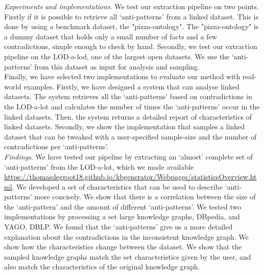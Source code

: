 \documentclass[11pt,letterpaper ,oneside ]{book}
\begin{document}
	\textit{Experiments and implementations}. We test our extraction pipeline on two points. Firstly if it is possible to retrieve all `anti-patterns' from a linked dataset. This is done by using a benchmark dataset, the "pizza-ontology". The "pizza-ontology" is a dummy dataset that holds only a small number of facts and a few contradictions, simple enough to check by hand. Secondly, we test our extraction pipeline on the LOD-a-lod, one of the largest open datasets. We use the `anti-patterns' from this dataset as input for analysis and sampling.\\
	
	Finally, we have selected two implementations to evaluate our method with real-world examples. Firstly, we have designed a system that can analyse linked datasets. The system retrieves all the  `anti-patterns' based on contradictions in the LOD-a-lot and calculates the number of times the `anti-patterns' occur in the linked datasets. Then, the system returns a detailed report of characteristics of linked datasets.
	Secondly, we show the implementation that samples a linked dataset that can be tweaked with a user-specified sample-size and the number of contradictions per `anti-patterns'. \\
	
	\textit{Findings}. We have tested our pipeline by extracting an `almost' complete set of `anti-patterns' from the LOD-a-lot\cite{JavierD:2017}, which we made available \\ \url{https://thomasdegroot18.github.io/kbgenerator/Webpages/statisticsOverview.html}. We developed a set of characteristics that can be used to describe `anti-patterns' more concisely. 
	We show that there is a correlation between the size of the `anti-pattern' and the amount of different `anti-patterns'. 
	We tested two implementations by processing a set large knowledge graphs, DBpedia\cite{DBpedia}, and YAGO\cite{YAGO}, DBLP\cite{DBLP}.
	We found that the `anti-patterns' give us a more detailed explanation about the contradictions in the inconsistent knowledge graph. 
	We show how the characteristics change between the dataset. We show that the sampled knowledge graphs match the set characteristics given by the user, and also match the characteristics of the original knowledge graph.\\
\end{document}
